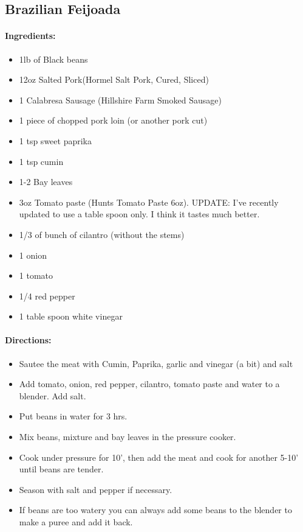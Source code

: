 \documentclass{article}
\begin{document}
\subsection{Brazilian Feijoada}

\paragraph{Ingredients:}
\begin{itemize}
    \item 1lb of Black beans
    \item 12oz Salted Pork(Hormel Salt Pork, Cured, Sliced)
    \item 1 Calabresa Sausage (Hillshire Farm Smoked Sausage)
    \item 1 piece of chopped pork loin (or another pork cut)
    \item 1 tsp sweet paprika
    \item 1 tsp cumin
    \item 1-2 Bay leaves
    \item 3oz Tomato paste (Hunts Tomato Paste 6oz). UPDATE: I've recently updated to use a table spoon only.  I think it tastes much better.
    \item 1/3 of bunch of cilantro (without the stems)
    \item 1 onion
    \item 1 tomato
    \item 1/4 red pepper
    \item 1 table spoon white vinegar
\end{itemize}

\paragraph{Directions:}
\begin{itemize}
    \item Sautee the meat with Cumin, Paprika, garlic and vinegar (a bit) and salt
    \item Add tomato, onion, red pepper, cilantro, tomato paste and water to a blender. Add salt.
    \item Put beans in water for 3 hrs.
    \item Mix beans, mixture and bay leaves in the pressure cooker.
    \item Cook under pressure for 10', then add the meat and cook for another 5-10' until beans are tender.
    \item Season with salt and pepper if necessary.
    \item If beans are too watery you can always add some beans to the blender to make a puree and add it back.
\end{itemize}
\end{document}
